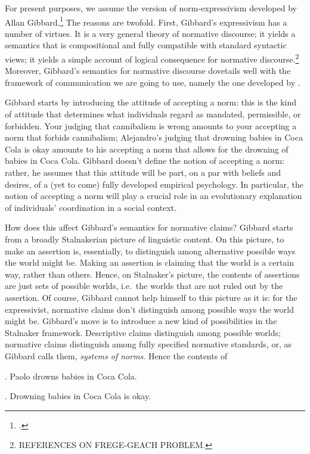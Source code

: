 \documentclass[11pt,article,oneside]{memoir}
\begin{document}
For present purposes, we assume the version of norm-expressivism developed by Allan Gibbard.\footcite{gibbard1990} The reasons are twofold. First, Gibbard's expressivism has a number of virtues. It is a very general theory of normative discourse; it yields a semantics that is compositional and fully compatible with standard syntactic views; it yields a simple account of logical consequence for normative discourse.\footnote{REFERENCES ON FREGE-GEACH PROBLEM.} Moreover, Gibbard's semantics for normative discourse dovetails well with the framework of communication we are going to use, namely the one developed by \citet{stalnaker1978}. 

Gibbard starts by introducing the attitude of accepting a norm: this is the kind of attitude that determines what individuals regard as mandated, permissible, or forbidden. Your judging that cannibalism is wrong amounts to your accepting a norm that forbids cannibalism; Alejandro's judging that drowning babies in Coca Cola is okay amounts to his accepting a norm that allows for the drowning of babies in Coca Cola. Gibbard doesn't define the notion of accepting a norm: rather, he assumes that this attitude will be part, on a par with beliefs and desires, of a (yet to come) fully developed empirical psychology. In particular, the notion of accepting a norm will play a crucial role in an evolutionary explanation of individuals' coordination in a social context.

How does this affect Gibbard's semantics for normative claims? Gibbard starts from a broadly Stalnakerian picture of linguistic content. On this picture, to make an assertion is, essentially, to distinguish among alternative possible ways the world might be. Making an assertion is claiming that the world is a certain way, rather than others. Hence, on Stalnaker's picture, the contents of assertions are just sets of possible worlds, i.e.~the worlds that are not ruled out by the assertion. Of course, Gibbard cannot help himself to this picture as it is: for the expressivist, normative claims don't distinguish among possible ways the world might be. Gibbard's move is to introduce a new kind of possibilities in the Stalnaker framework. Descriptive claims distinguish among possible worlds; normative claims distinguish among fully specified normative standards, or, as Gibbard calls them, \emph{systems of norms}. Hence the contents of 

\ex. Paolo drowns babies in Coca Cola.

\ex. Drowning babies in Coca Cola is okay.
\end{document}

